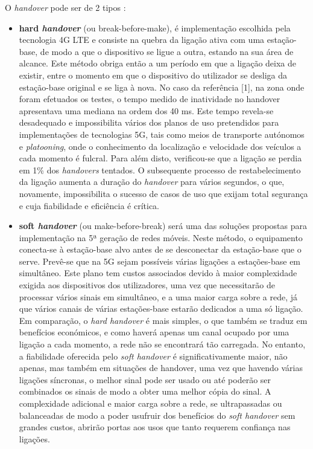 \documentclass{llncs}
\begin{document}
O \textit{handover} pode ser de 2 tipos :
\begin{itemize}
	\item \textbf{hard \textit{handover}} (ou break-before-make), é implementação escolhida pela tecnologia 4G LTE e consiste na quebra da ligação ativa com uma estação-base, de modo a que o dispositivo se ligue a outra, estando na sua área de alcance. Este método obriga então a um período em que a ligação deixa de existir, entre o momento em que o dispositivo do utilizador se desliga da estação-base original e se liga à nova. No caso da referência [1], na zona onde foram efetuados os testes, o tempo medido de inatividade no handover apresentava uma mediana na ordem dos 40 ms. Este tempo revela-se desadequado e impossibilita vários dos planos de uso pretendidos para implementações de tecnologias 5G, tais como meios de transporte autónomos e \textit{platooning}, onde o conhecimento da localização e velocidade dos veículos a cada momento é fulcral. Para além disto, verificou-se que a ligação se perdia em 1\% dos \textit{handovers} tentados. O subsequente processo de restabelecimento da ligação aumenta a duração do \textit{handover} para vários segundos, o que, novamente, impossibilita o sucesso de casos de uso que exijam total segurança e cuja fiabilidade e eficiência é crítica.
	\item \textbf{soft \textit{handover}} (ou make-before-break) será uma das soluções propostas para implementação na 5ª geração de redes móveis. Neste método, o equipamento conecta-se à estação-base alvo antes de se desconectar da estação-base que o serve. Prevê-se que na 5G sejam possíveis várias ligações a estações-base em simultâneo. Este plano tem custos associados devido à maior complexidade exigida aos dispositivos dos utilizadores, uma vez que necessitarão de processar vários sinais em simultâneo, e a uma maior carga sobre a rede, já que vários canais de várias estações-base estarão dedicados a uma só ligação. Em comparação, o \textit{hard handover} é mais simples, o que também se traduz em benefícios económicos, e como haverá apenas um canal ocupado por uma ligação a cada momento, a rede não se encontrará tão carregada. No entanto, a fiabilidade oferecida pelo \textit{soft handover} é significativamente maior, não apenas, mas também em situações de handover, uma vez que havendo várias ligações síncronas, o melhor sinal pode ser usado ou até poderão ser combinados os sinais de modo a obter uma melhor cópia do sinal. A complexidade adicional e maior carga sobre a rede, se ultrapassadas ou balanceadas de modo a poder usufruir dos benefícios do \textit{soft handover} sem grandes custos, abrirão portas aos usos que tanto requerem confiança nas ligações.
\end{itemize}
\end{document}
